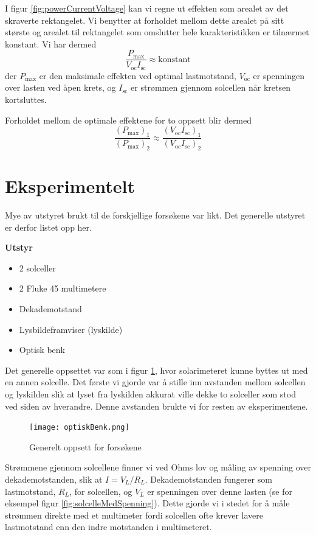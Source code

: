 \documentclass[a4paper,11pt, twocolumn]{article}
\begin{document}
I figur \ref{fig:powerCurrentVoltage} kan vi regne ut effekten som arealet av det skraverte rektangelet. Vi benytter at forholdet mellom dette arealet på sitt største og arealet til rektangelet som omslutter hele karakteristikken er tilnærmet konstant. Vi har dermed 
\begin{equation}
	\frac{P_\text{max}}{V_\text{oc}I_\text{sc}}\approx\text{konstant}
\end{equation}
der $P_\text{max}$ er den maksimale effekten ved optimal lastmotstand, $V_\text{oc}$ er spenningen over lasten ved åpen krets, og $I_\text{sc}$ er strømmen gjennom solcellen når kretsen kortsluttes.

Forholdet mellom de optimale effektene for to oppsett blir dermed
\begin{equation}
	\frac{(P_\text{max})_1}{(P_\text{max})_2} \approx \frac{(V_\text{oc}I_\text{sc})_1}{(V_\text{oc}I_\text{sc})_2}
	\label{eq:forhold}
\end{equation}
\section{Eksperimentelt}
Mye av utstyret brukt til de forskjellige forsøkene var likt. Det generelle utstyret er derfor listet opp her.

{\bf Utstyr}
\begin{itemize}
	\item 2 solceller
	\item 2 Fluke 45 multimetere
	\item Dekademotstand
	\item Lysbildeframviser (lyskilde)
	\item Optisk benk
\end{itemize}

Det generelle oppsettet var som i figur \ref{fig:oppsett}, hvor solarimeteret kunne byttes ut med en annen solcelle. Det første vi gjorde var å stille inn avstanden mellom solcellen og lyskilden slik at lyset fra lyskilden akkurat ville dekke to solceller som stod ved siden av hverandre. Denne avstanden brukte vi for resten av eksperimentene.
\begin{figure}[ht!]
	\texttt{[image: optiskBenk.png]}
	\caption{Generelt oppsett for forsøkene}
	\label{fig:oppsett}
\end{figure}
Strømmene gjennom solcellene finner vi ved Ohms lov og måling av spenning over dekademotstanden, slik at $I = V_L/R_L$. Dekademotstanden fungerer som lastmotstand, $R_L$, for solcellen, og $V_L$ er spenningen over denne lasten (se for eksempel figur \ref{fig:solcelleMedSpenning}). Dette gjorde vi i stedet for å måle strømmen direkte med et multimeter fordi solcellen ofte krever lavere lastmotstand enn den indre motstanden i multimeteret.
\end{document}
